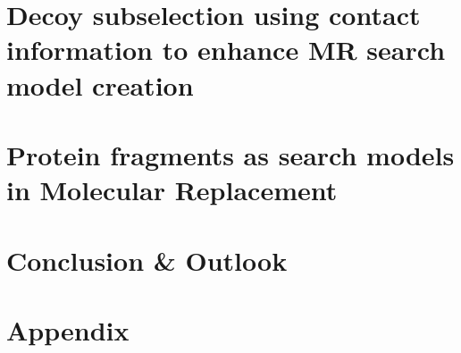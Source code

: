 \documentclass[11pt,twoside,reqno,openright]{report}
\begin{document}
\chapter{Decoy subselection using contact information to enhance MR search model creation} \label{chap:ample_decoys}
\clearpage
% 

\chapter{Protein fragments as search models in Molecular Replacement} \label{chap:ample_flib}
\clearpage
% 

\chapter{Conclusion \& Outlook}
\clearpage
% 

\appendix
\chapter{Appendix}
\clearpage
% 

\printbibliography[heading=bibintoc]
\end{document}
